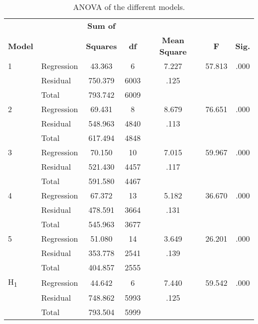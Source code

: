 \vspace*{\fill}
\begin{table}[h]
\centering{}%
\begin{minipage}[t]{1\columnwidth}%
\begin{center}
\renewcommand{\arraystretch}{1.5}%
\begin{tabular}{llccccc}
\hline 
 &  & \textbf{Sum of} &  &  &  & \tabularnewline
\textbf{Model} &  & \textbf{Squares} & \textbf{df} & \textbf{Mean Square} & \textbf{F} & \textbf{Sig.}\tabularnewline
\hline 
\hline 
\textsc{1} & Regression & 43.363 & 6 & 7.227 & 57.813 & .000\tabularnewline
 & Residual & 750.379 & 6003 & .125 &  & \tabularnewline
 & Total & 793.742 & 6009 &  &  & \tabularnewline
\hline 
\textsc{2} & Regression & 69.431 & 8 & 8.679 & 76.651 & .000\tabularnewline
 & Residual & 548.963 & 4840 & .113 &  & \tabularnewline
 & Total & 617.494 & 4848 &  &  & \tabularnewline
\hline 
\textsc{3} & Regression & 70.150 & 10 & 7.015 & 59.967 & .000\tabularnewline
 & Residual & 521.430 & 4457 & .117 &  & \tabularnewline
 & Total & 591.580 & 4467 &  &  & \tabularnewline
\hline 
\textsc{4} & Regression & 67.372 & 13 & 5.182 & 36.670 & .000\tabularnewline
 & Residual & 478.591 & 3664 & .131 &  & \tabularnewline
 & Total & 545.963 & 3677 &  &  & \tabularnewline
\hline 
\textsc{5} & Regression & 51.080 & 14 & 3.649 & 26.201 & .000\tabularnewline
 & Residual & 353.778 & 2541 & .139 &  & \tabularnewline
 & Total & 404.857 & 2555 &  &  & \tabularnewline
\hline 
\textsc{H}\textsubscript{\textsc{1}} & Regression & 44.642 & 6 & 7.440 & 59.542 & .000\tabularnewline
 & Residual & 748.862 & 5993 & .125 &  & \tabularnewline
 & Total & 793.504 & 5999 &  &  & \tabularnewline
\hline 
\end{tabular}\bigskip{}
\par\end{center}
\begin{center}
\caption{ANOVA of the different models.\label{tab:ANOVA-table}}
\par\end{center}%
\end{minipage}
\end{table}
\vspace*{\fill}


